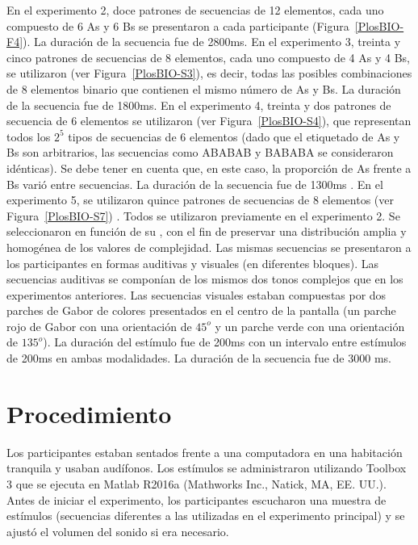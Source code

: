 En el experimento 2, doce patrones de secuencias de 12 elementos, cada uno compuesto de 6 As y 6 Bs se presentaron a cada participante (Figura~\ref{PlosBIO-F4}). La duración de la secuencia fue de 2800ms. En el experimento 3, treinta y cinco patrones de secuencias de 8 elementos, cada uno compuesto de 4 As y 4 Bs, se utilizaron (ver Figura~\ref{PlosBIO-S3}), es decir, todas las posibles combinaciones de 8 elementos binario que contienen el mismo número de As y Bs. La duración de la secuencia fue de 1800ms. En el experimento 4, treinta y dos patrones de secuencia de 6 elementos se utilizaron (ver Figura~\ref{PlosBIO-S4}), que representan todos los $2^5$ tipos de secuencias de 6 elementos (dado que el etiquetado de As y Bs son arbitrarios, las secuencias como ABABAB y BABABA se consideraron idénticas). Se debe tener en cuenta que, en este caso, la proporción de As frente a Bs varió entre secuencias. La duración de la secuencia fue de 1300ms . En el experimento 5, se utilizaron quince patrones de secuencias de 8 elementos (ver Figura~\ref{PlosBIO-S7}) . Todos se utilizaron previamente en el experimento 2. Se seleccionaron en función de su \mdlbin, con el fin de preservar una distribución amplia y homogénea de los valores de complejidad. Las mismas secuencias se presentaron a los participantes en formas auditivas y visuales (en diferentes bloques). Las secuencias auditivas se componían de los mismos dos tonos complejos que en los experimentos anteriores. Las secuencias visuales estaban compuestas por dos parches de Gabor de colores presentados en el centro de la pantalla (un parche rojo de Gabor con una orientación de $45^o$ y un parche verde con una orientación de $135^o$). La duración del estímulo fue de 200ms con un intervalo entre estímulos de 200ms en ambas modalidades. La duración de la secuencia fue de 3000 ms.

\section{Procedimiento}


Los participantes estaban sentados frente a una computadora en una habitación tranquila y usaban audífonos. Los estímulos se administraron utilizando  Toolbox 3 \cite{f134,f135} que se ejecuta en Matlab R2016a (Mathworks Inc., Natick, MA, EE. UU.). Antes de iniciar el experimento, los participantes escucharon una muestra de estímulos (secuencias diferentes a las utilizadas en el experimento principal) y se ajustó el volumen del sonido si era necesario.

